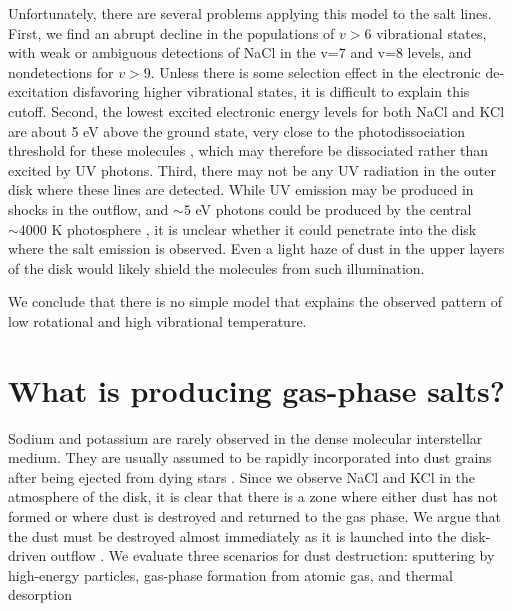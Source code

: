 \documentclass[12pt]{article}
\begin{document}

Unfortunately, there are several problems applying this model to the salt lines.
First, we find an abrupt decline in the populations of $v > 6$ vibrational states,
with weak or ambiguous detections of NaCl in the v=7 and v=8 levels, and
nondetections for $v > 9$.  Unless there is
some selection effect in the electronic de-excitation disfavoring higher vibrational
states, it is difficult to explain this cutoff.  
Second, the lowest excited electronic energy levels for both NaCl and KCl are about
5 eV above the ground state, very close to the photodissociation threshold for these
molecules \cite{Zeiri1983, Silver1986}, which
may therefore be dissociated rather than excited by UV photons.
Third, there may not be any UV radiation in the outer disk where these lines
are detected.  
While UV
emission may be produced in shocks in the outflow, and $\sim5$ eV photons
could be produced by the central $\sim4000$ K photosphere \cite{Testi2010a},
it is unclear whether it could penetrate into the disk where the salt emission
is observed.  Even a light haze of dust in the upper layers of the disk would
likely shield the molecules from such illumination.

We conclude that there is no simple model that explains the observed pattern of
low rotational and high vibrational temperature.



\section*{What is producing gas-phase salts?}

Sodium and potassium are rarely observed in the dense molecular interstellar
medium.  They are usually assumed to be rapidly incorporated into dust grains
after being ejected from dying stars \cite{Milam2007a}.  Since we
observe NaCl and KCl in the atmosphere of the disk, it is clear that
there is a zone where either dust has not  formed or
where dust is destroyed and returned to the gas phase.  We argue that the dust
must be destroyed almost immediately as it is launched into the disk-driven
outflow \cite{Hirota2017a}. We evaluate three scenarios for dust destruction:
sputtering by high-energy particles, gas-phase formation from atomic gas, and
thermal desorption
\end{document}
